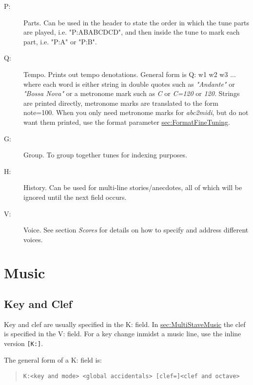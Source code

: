 \documentclass[a4paper]{article}
\begin{document}
\begin{description}
\item[P:] Parts. Can be used in the header to state the order in  which
the  tune parts are played, i.e. "P:ABABCDCD", and then inside the
tune to mark each part, i.e. "P:A" or "P:B".

 
\item[Q:] Tempo. 
Prints out tempo denotations.
General form is Q: w1 w2 w3 ... where each word is either
string in double quotes such as {\it "Andante"} or {\it "Bossa Nova"}
or a metronome mark such as {\it C} or {\it C=120} or {\it 120}.
Strings are printed directly, metronome marks are translated 
to the form note=100. When you only need metronome marks for 
{\it abc2midi}, but do not want them printed, use the format parameter
\hyperref{{\it \%\%printmetronome}}{{\it \%\%printmetronome} 
(see section }{)}{sec:FormatFineTuning}.

\item[G:] Group. To group together tunes for indexing purposes.

\item[H:] History. Can be used for multi-line stories/anecdotes, all of
which will be ignored until the next field occurs.

\item[V:] Voice. See section {\it Scores} for details on how to
specify and address different voices.

\end{description}

\section{Music}

\subsection{Key and Clef}
\label{sec:KeyAndClef}
 
Key and clef are usually specified in the K: field. In 
\hyperref{multi stave music,}{multi stave music, (see section }{)}
{sec:MultiStaveMusic} the clef is specified in the V: field.
For a key change inmidst a music line, use the inline version \verb$[K:]$.
\par
The general form of a K: field is:
\begin{quote}
\begin{verbatim}
K:<key and mode> <global accidentals> [clef=]<clef and octave>
\end{verbatim}
\end{quote}
\end{document}
